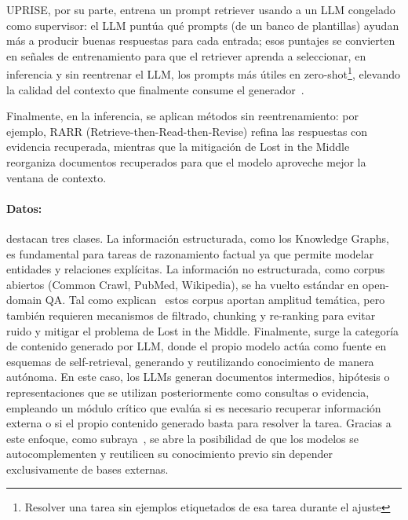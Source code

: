 UPRISE, por su parte, entrena un prompt retriever usando a un LLM congelado como supervisor: el LLM puntúa qué prompts (de un banco de plantillas) 
ayudan más a producir buenas respuestas para cada entrada; esos puntajes se convierten en señales de entrenamiento para que el retriever aprenda a seleccionar, 
en inferencia y sin reentrenar el LLM, los prompts más útiles en zero-shot\footnote{Resolver una tarea sin ejemplos etiquetados de esa tarea durante el ajuste}, elevando la calidad del contexto que finalmente consume el 
generador~\textcite{zhao2024rag,fan2024ragllm}.

Finalmente, en la inferencia, se aplican métodos sin reentrenamiento: por ejemplo, 
RARR (Retrieve-then-Read-then-Revise) refina las respuestas con evidencia recuperada, mientras que la mitigación de Lost in the Middle reorganiza documentos recuperados
para que el modelo aproveche mejor la ventana de contexto.

\paragraph{Datos:} \textcite{fan2024ragllm} destacan tres clases. La información estructurada, como los Knowledge Graphs, es fundamental para tareas de razonamiento 
factual ya que permite modelar entidades y relaciones explícitas. La información no estructurada, como corpus abiertos (Common Crawl, PubMed, Wikipedia), se ha vuelto estándar en open-domain QA.
Tal como explican~\textcite{gao2023rag} estos corpus aportan amplitud temática, pero también requieren mecanismos de filtrado, chunking y re-ranking 
para evitar ruido y mitigar el problema de Lost in the Middle. Finalmente, surge la categoría de contenido generado por LLM, donde el propio modelo actúa 
como fuente en esquemas de self-retrieval, generando y reutilizando conocimiento de manera autónoma. En este caso, los LLMs generan documentos intermedios, 
hipótesis o representaciones que se utilizan posteriormente como consultas o evidencia, empleando un módulo crítico que evalúa si es necesario recuperar información externa o 
si el propio contenido generado basta para resolver la tarea. Gracias a este enfoque, como subraya~\textcite{fan2024ragllm}, se abre la posibilidad de que los modelos se autocomplementen y 
reutilicen su conocimiento previo sin depender exclusivamente de bases externas.

